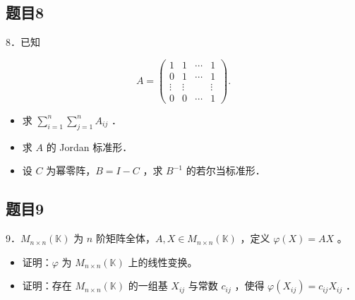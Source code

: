 \documentclass{article}
\begin{document}
\subsection{题目8}
8．已知

\[
A=\left(\begin{array}{cccc}
1 & 1 & \cdots & 1 \\
0 & 1 & \cdots & 1 \\
\vdots & \vdots & & \vdots \\
0 & 0 & \cdots & 1
\end{array}\right) .
\]

\begin{itemize}
  \item[（1）] 求 \(\sum_{i=1}^{n} \sum_{j=1}^{n} A_{i j}\) ．
  \item[（2）] 求 \(A\) 的 Jordan 标准形．
  \item[（3）] 设 \(C\) 为幂零阵，\(B=I-C\) ，求 \(B^{-1}\) 的若尔当标准形．
\end{itemize}

\subsection{题目9}
9．\(M_{n \times n}(\mathbb{K})\) 为 \(n\) 阶矩阵全体，\(A, X \in M_{n \times n}(\mathbb{K})\) ，定义 \(\varphi(X)=A X\) 。

\begin{itemize}
  \item[（1）] 证明：\(\varphi\) 为 \(M_{n \times n}(\mathbb{K})\) 上的线性变换。
  \item[（2）] 证明：存在 \(M_{n \times n}(\mathbb{K})\) 的一组基 \(X_{i j}\) 与常数 \(c_{i j}\) ，使得 \(\varphi\left(X_{i j}\right)=c_{i j} X_{i j}\) ．
\end{itemize}
\end{document}
